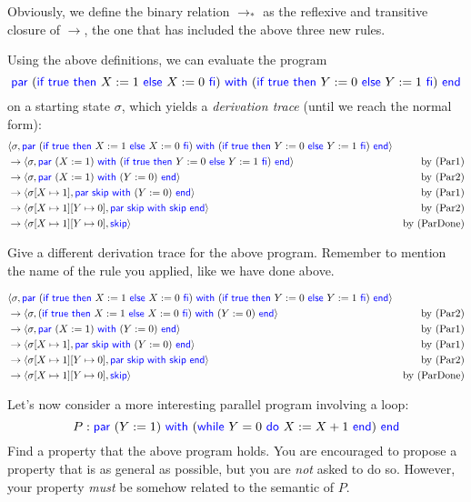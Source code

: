 \documentclass[11pt,a4paper]{article}
\newcommand{\toM}{\to_{*}}
\newcommand{\pair}[1]{\langle #1 \rangle}
\newcommand{\kword}[1]{{\color{blue} \textsf{#1}}}
\newcommand{\True}{\kword{true}}
\newcommand{\Skip}{\kword{skip}}
\newcommand{\If}{\kword{if}}
\newcommand{\Then}{\kword{then}}
\newcommand{\Else}{\kword{else}}
\newcommand{\Fi}{\kword{fi}}
\newcommand{\While}{\kword{while}}
\newcommand{\Do}{\kword{do}}
\newcommand{\End}{\kword{end}}
\newcommand{\Par}{\kword{par}}
\newcommand{\With}{\kword{with}}
\begin{document}
Obviously, we define the binary relation $\toM$ as the reflexive and transitive closure of $\to$,
the one that has included the above three new rules.

Using the above definitions, we can evaluate the program
$$\Par~(\If~\True~\Then~X:=1~\Else~X:=0~\Fi)~\With~(\If~\True~\Then~Y:=0~\Else~Y:=1~\Fi)~\End$$
on a starting state $\sigma$, which yields a \emph{derivation trace} (until we reach the normal form):
\begin{align*}
	&    \pair{\sigma,\Par~(\If~\True~\Then~X:=1~\Else~X:=0~\Fi)~\With~(\If~\True~\Then~Y:=0~\Else~Y:=1~\Fi)~\End} & \\
	&\to \pair{\sigma,\Par~(X:=1)~\With~(\If~\True~\Then~Y:=0~\Else~Y:=1~\Fi)~\End} & \text{by (Par1)} \\
	&\to \pair{\sigma,\Par~(X:=1)~\With~(Y:=0)~\End} & \text{by (Par2)} \\
	&\to \pair{\sigma[X \mapsto 1],\Par~\Skip~\With~(Y:=0)~\End} & \text{by (Par1)} \\
	&\to \pair{\sigma[X \mapsto 1][Y \mapsto 0],\Par~\Skip~\With~\Skip~\End} & \text{by (Par2)} \\
	&\to \pair{\sigma[X \mapsto 1][Y \mapsto 0],\Skip} & \text{by (ParDone)}
\end{align*}

\subproblem Give a different derivation trace for the above program.
Remember to mention the name of the rule you applied, like we have done above.

\begin{solution}
\begin{align*}
&    \pair{\sigma,\Par~(\If~\True~\Then~X:=1~\Else~X:=0~\Fi)~\With~(\If~\True~\Then~Y:=0~\Else~Y:=1~\Fi)~\End} & \\
&\to \pair{\sigma,(\If~\True~\Then~X:=1~\Else~X:=0~\Fi)~\With~(Y:=0)~\End} & \text{by (Par2)} \\
&\to \pair{\sigma,\Par~(X:=1)~\With~(Y:=0)~\End} & \text{by (Par1)} \\
&\to \pair{\sigma[X \mapsto 1],\Par~\Skip~\With~(Y:=0)~\End} & \text{by (Par1)} \\
&\to \pair{\sigma[X \mapsto 1][Y \mapsto 0],\Par~\Skip~\With~\Skip~\End} & \text{by (Par2)} \\
&\to \pair{\sigma[X \mapsto 1][Y \mapsto 0],\Skip} & \text{by (ParDone)}
\end{align*}

\end{solution}

\subproblem Let's now consider a more interesting parallel program involving a loop:
$$P: \Par~(Y:=1)~\With~(\While~Y=0~\Do~X:=X+1~\End)~\End$$
Find a property that the above program holds.
You are encouraged to propose a property that is as general as possible, but you are \emph{not} asked to do so.
However, your property \emph{must} be somehow related to the semantic of $P$.
\end{document}
